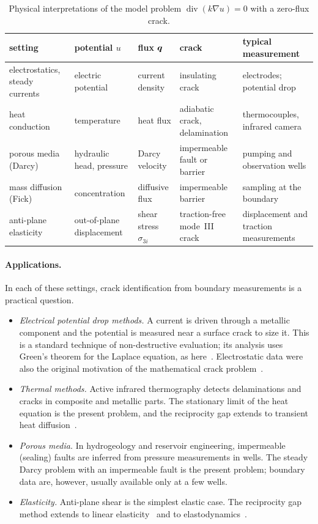 \begin{table}[h]
\centering\small
\renewcommand{\arraystretch}{1.15}
\begin{tabular}{>{\raggedright}p{2.6cm}>{\raggedright}p{2.3cm}>{\raggedright}p{2.6cm}>{\raggedright}p{2.6cm}>{\raggedright\arraybackslash}p{3.7cm}}
\toprule
\sffamily setting & \sffamily potential $u$ & \sffamily flux $\bm{q}$ & \sffamily crack & \sffamily typical measurement\\
\midrule
electrostatics, steady currents & electric potential & current density & insulating crack & electrodes; potential drop\\
heat conduction & temperature & heat flux & adiabatic crack, delamination & thermocouples, infrared camera\\
porous media (Darcy) & hydraulic head, pressure & Darcy velocity & impermeable fault or barrier & pumping and observation wells\\
mass diffusion (Fick) & concentration & diffusive flux & impermeable barrier & sampling at the boundary\\
anti-plane elasticity & out-of-plane displacement & shear stress $\sigma_{3i}$ & traction-free mode~III crack & displacement and traction measurements\\
\bottomrule
\end{tabular}
\caption{Physical interpretations of the model problem $\operatorname{div}(k\nabla u)=0$ with a zero-flux crack.}
\label{tab:rg-phys}
\end{table}

\paragraph{Applications.} In each of these settings, crack identification from boundary measurements is a practical question.
\begin{itemize}[itemsep=1pt]
\item \emph{Electrical potential drop methods.} A current is driven through a metallic component and the potential is measured near a surface crack to size it. This is a standard technique of non-destructive evaluation; its analysis uses Green's theorem for the Laplace equation, as here~\cite{IYM91}. Electrostatic data were also the original motivation of the mathematical crack problem~\cite{FV89,SV91}.
\item \emph{Thermal methods.} Active infrared thermography detects delaminations and cracks in composite and metallic parts. The stationary limit of the heat equation is the present problem, and the reciprocity gap extends to transient heat diffusion~\cite{BCM05}.
\item \emph{Porous media.} In hydrogeology and reservoir engineering, impermeable (sealing) faults are inferred from pressure measurements in wells. The steady Darcy problem with an impermeable fault is the present problem; boundary data are, however, usually available only at a few wells.
\item \emph{Elasticity.} Anti-plane shear is the simplest elastic case. The reciprocity gap method extends to linear elasticity~\cite{ABB99} and to elastodynamics~\cite{BCM04,BCM05}.
\end{itemize}



